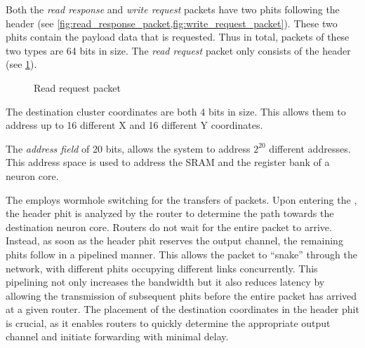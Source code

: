 Both the \textit{read response} and \textit{write request} packets have two phits following the header (see \cref{fig:read_response_packet,fig:write_request_packet}).
These two phits contain the payload data that is requested.
Thus in total, packets of these two types are 64 bits in size.
The \textit{read request} packet only consists of the header (see \cref{fig:read_request_packet}).

\hspace*{0.5em}
\begin{figure}[hbtp]
    \centering
    \begin{adjustbox}{width=0.7\linewidth}
        
    \end{adjustbox}
    \caption{Read request packet}
    \label{fig:read_request_packet}
\end{figure}

The destination cluster coordinates are both 4 bits in size.
This allows them to address up to 16 different X and 16 different Y coordinates.

The \textit{address field} of 20 bits, allows the system to address $2^{20}$ different addresses.
This address space is used to address the SRAM and the register bank of a neuron core.

The \confignoc{} employs wormhole switching for the transfers of packets.
Upon entering the \confignoc{}, the header phit is analyzed by the router to determine the path towards the destination neuron core.
Routers do not wait for the entire packet to arrive.
Instead, as soon as the header phit reserves the output channel, the remaining phits follow in a pipelined manner.
This allows the packet to ``snake'' through the network, with different phits occupying different links concurrently.
This pipelining not only increases the bandwidth but it also reduces latency by allowing the transmission of subsequent phits before the entire packet has arrived at a given router.
The placement of the destination coordinates in the header phit is crucial, as it enables routers to quickly determine the appropriate output channel and initiate forwarding with minimal delay.


